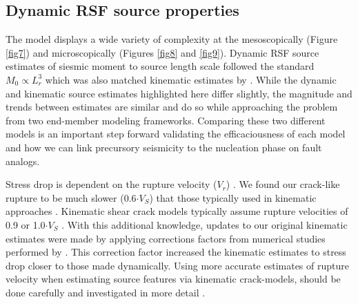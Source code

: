 \documentclass[preprint,1p, 10pt,authoryear]{elsarticle}
\begin{document}
\subsection{Dynamic RSF source properties}
The model displays a wide variety of complexity at the mesoscopically (Figure \ref{fig7}) and microscopically (Figures \ref{fig8} and \ref{fig9}). Dynamic RSF source estimates of siesmic moment to source length scale followed the standard $M_{0} \propto L^{3}_{r}$  which was also matched kinematic estimates by \citet{Selvadurai2019}. While the dynamic and kinematic source estimates highlighted here differ slightly, the magnitude and trends between estimates are similar and do so while approaching the problem from two end-member modeling frameworks. Comparing these two different models is an important step forward validating the efficaciousness of each model and how we can link precursory seismicity to the nucleation phase on fault analogs.

Stress drop is dependent on the rupture velocity ($V_{r}$) \citep{Kaneko2015}. We found our crack-like rupture to be much slower (0.6$\cdot V_{S}$) that those typically used in kinematic approaches \citep[e.g.][]{Cocco2016}. Kinematic shear crack models typically assume rupture velocities of 0.9 or 1.0$\cdot V_{S}$ \citep{Cocco2016, Selvadurai2019}. With this additional knowledge, updates to our original kinematic estimates were made by applying corrections factors from numerical studies performed by \citet{Kaneko2015}. This correction factor increased the kinematic estimates to stress drop closer to those made dynamically. Using more accurate estimates of rupture velocity when estimating source features via kinematic crack-models, should be done carefully and investigated in more detail \citep{McGuire2018}.
\end{document}
